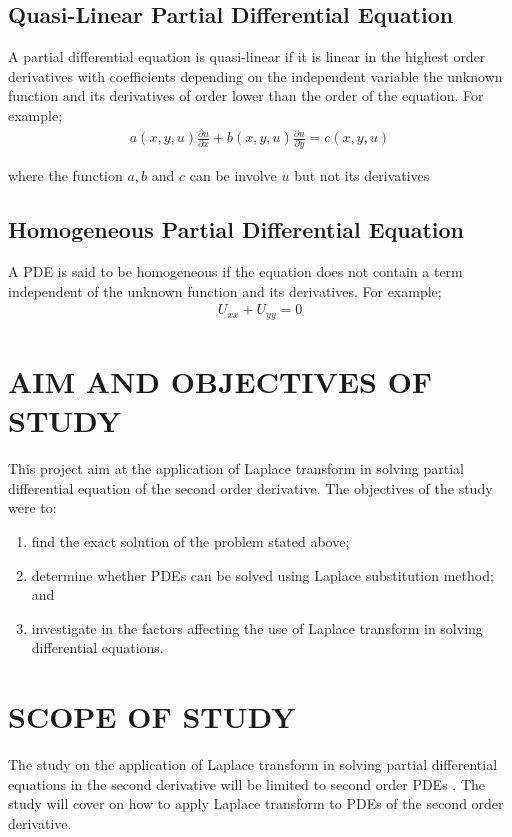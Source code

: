\documentclass[11pt]{report}
\newcommand{\PDEs}{PDEs }
\begin{document}
	\subsection{Quasi-Linear Partial Differential Equation}
	A partial differential equation is quasi-linear if it is linear in the highest order derivatives with coefficients depending on the independent variable the unknown function and its derivatives of order lower than the order of the equation. For example;
	\begin{eqnarray}
		a(x,y,u)\frac{\partial u}{\partial x}+ b(x,y,u)\frac{\partial u}{\partial y} = c(x,y,u)\label{eq:3_7}
	\end{eqnarray}
	\begin{center}where the function $a,b$ and $c$ can be involve $u$ but not its derivatives\end{center}
	
	\subsection{Homogeneous Partial Differential Equation}
	A PDE is said to be homogeneous if the equation does not contain a term independent of the unknown function and its derivatives. For example;
	\begin{eqnarray}
		U_{xx} + U_{yy} = 0\label{eq:3_8}
	\end{eqnarray}

	\section{AIM AND OBJECTIVES OF STUDY}
	This project aim at the application of Laplace transform in solving partial differential equation of the second order derivative. The objectives of the study were to:
	\begin{enumerate}
		\renewcommand{\labelenumi}{\roman{enumi}.}
		\item find the exact solution of the problem stated above;
		\item determine whether \PDEs can be solved using Laplace substitution method; and
		\item investigate in the factors affecting the use of Laplace transform in solving differential equations.
	\end{enumerate}

	\section{SCOPE OF STUDY}
	The study on the application of Laplace transform in solving partial differential equations in the second derivative will be limited to second order \PDEs. The study will cover on how to apply Laplace transform to \PDEs of the second order derivative. 
	
\end{document}

